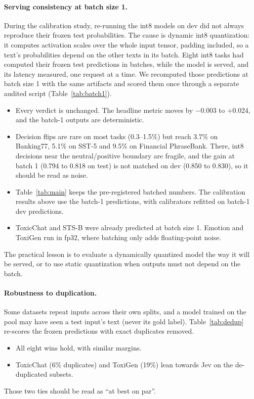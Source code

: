 \documentclass[11pt]{article}
\begin{document}
\paragraph{Serving consistency at batch size 1.}
During the calibration study, re-running the int8 models on dev did not always reproduce their frozen test probabilities.
The cause is dynamic int8 quantization: it computes activation scales over the whole input tensor, padding included, so a text's probabilities depend on the other texts in its batch.
Eight int8 tasks had computed their frozen test predictions in batches, while the model is served, and its latency measured, one request at a time.
We recomputed those predictions at batch size 1 with the same artifacts and scored them once through a separate audited script (Table~\ref{tab:batch1}).
\begin{itemize}
  \item Every verdict is unchanged. The headline metric moves by $-0.003$ to $+0.024$, and the batch-1 outputs are deterministic.
  \item Decision flips are rare on most tasks (0.3--1.5\%) but reach 3.7\% on Banking77, 5.1\% on SST-5 and 9.5\% on Financial PhraseBank. There, int8 decisions near the neutral/positive boundary are fragile, and the gain at batch 1 (0.794 to 0.818 on test) is not matched on dev (0.850 to 0.830), so it should be read as noise.
  \item Table~\ref{tab:main} keeps the pre-registered batched numbers. The calibration results above use the batch-1 predictions, with calibrators refitted on batch-1 dev predictions.
  \item ToxicChat and STS-B were already predicted at batch size 1. Emotion and ToxiGen run in fp32, where batching only adds floating-point noise.
\end{itemize}

The practical lesson is to evaluate a dynamically quantized model the way it will be served, or to use static quantization when outputs must not depend on the batch.

\paragraph{Robustness to duplication.}
Some datasets repeat inputs across their own splits, and a model trained on the pool may have seen a test input's text (never its gold label).
Table~\ref{tab:dedup} re-scores the frozen predictions with exact duplicates removed.
\begin{itemize}
  \item All eight wins hold, with similar margins.
  \item ToxicChat (6\% duplicates) and ToxiGen (19\%) lean towards Jev on the de-duplicated subsets.
\end{itemize}
Those two ties should be read as ``at best on par''.

\end{document}
